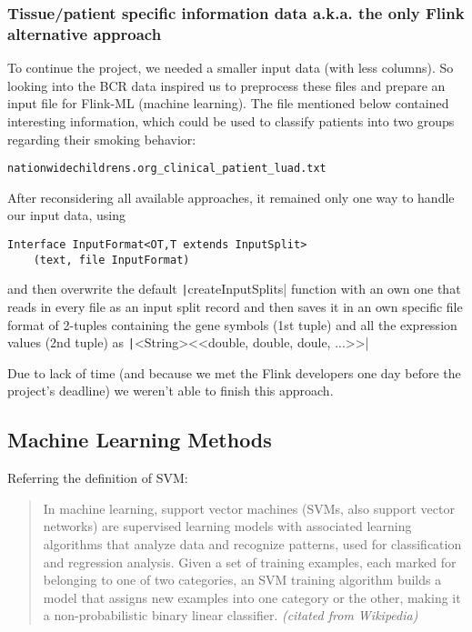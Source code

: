 \documentclass{bioinfo}
\begin{document}
\begin{methods}
\subsubsection{Tissue/patient specific information data a.k.a. the only Flink alternative approach}

To continue the project, we needed a smaller input data (with less columns). So looking into the BCR data inspired us to preprocess these files and prepare an input file for Flink-ML (machine learning). The file mentioned below contained interesting information, which could be used to classify patients into two groups regarding their smoking behavior:
\begin{verbatim}
nationwidechildrens.org_clinical_patient_luad.txt
\end{verbatim}

After reconsidering all available approaches, it remained only one way to handle our input data, using
\begin{verbatim}
Interface InputFormat<OT,T extends InputSplit>
	(text, file InputFormat)
\end{verbatim}
and then overwrite the default 
\texttt|createInputSplits|
function with an own one that reads in every file as an input split record and then saves it in an own specific file format of 2-tuples containing the gene symbols (1st tuple) and all the expression values (2nd tuple) as \texttt|<String><<double, double, doule, ...>>| 

Due to lack of time (and because we met the Flink developers one day before the project's deadline) we weren't able to finish this approach.


\subsection{Machine Learning Methods}

Referring the definition of SVM:

\begin{quotation}
In machine learning, support vector machines (SVMs, also support vector networks) are supervised learning models with associated learning algorithms that analyze data and recognize patterns, used for classification and regression analysis. Given a set of training examples, each marked for belonging to one of two categories, an SVM training algorithm builds a model that assigns new examples into one category or the other, making it a non-probabilistic binary linear classifier. \textit{(citated from Wikipedia)}
\end{quotation}


\end{methods}
\end{document}
